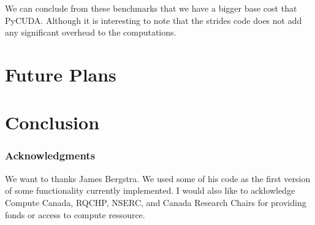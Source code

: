 \documentclass{article} %
\begin{document}
We can conclude from these benchmarks that we have a bigger base cost that PyCUDA.  Although it is interesting to note that the strides code does not add any significant overhead to the computations.

\section{Future Plans}
\section{Conclusion}

% 
% 


\subsubsection*{Acknowledgments}

We want to thanks James Bergstra. We used some of his code as the first version of some functionality currently implemented. I would also like to acklowledge Compute Canada, RQCHP, NSERC, and Canada Research Chairs for providing fonds or access to compute ressource.




\end{document}
